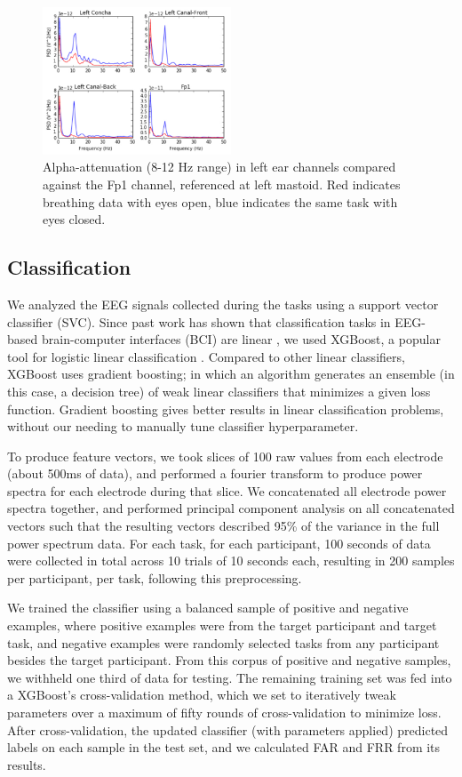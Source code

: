 \documentclass{sigchi}
\begin{document}
\begin{figure}[h]
\centering
\includegraphics[width=0.5\textwidth]{figures/002_AlphaAtt_all.jpg}
\caption{Alpha-attenuation (8-12 Hz range) in left ear channels compared against the Fp1 channel, referenced at left mastoid. Red indicates breathing data with eyes open, blue indicates the same task with eyes closed.}
\label{fig:alpha_atten}
\end{figure}

\subsection{Classification}

We analyzed the EEG signals collected during the tasks using a support vector classifier (SVC). Since past work has shown that classification tasks in EEG-based brain-computer interfaces (BCI) are linear \cite{Garrett2003a}, we used XGBoost, a popular tool for logistic linear classification \cite{Chen2016}. Compared to other linear classifiers, XGBoost uses gradient boosting; in which an algorithm generates an ensemble (in this case, a decision tree) of weak linear classifiers that minimizes a given loss function. Gradient boosting gives better results in linear classification problems, without our needing to manually tune classifier hyperparameter.

To produce feature vectors, we took slices of 100 raw values from each electrode (about 500ms of data), and performed a fourier transform to produce power spectra for each electrode during that slice. We concatenated all electrode power spectra together, and performed principal component analysis on all concatenated vectors such that the resulting vectors described 95\% of the variance in the full power spectrum data. For each task, for each participant, 100 seconds of data were collected in total across 10 trials of 10 seconds each, resulting in 200 samples per participant, per task, following this preprocessing.

We trained the classifier using a balanced sample of positive and negative examples, where positive examples were from the target participant and target task, and negative examples were randomly selected tasks from any participant besides the target participant. From this corpus of positive and negative samples, we withheld one third of data for testing. The remaining training set was fed into a XGBoost's cross-validation method, which we set to iteratively tweak parameters over a maximum of fifty rounds of cross-validation to minimize loss. After cross-validation, the updated classifier (with parameters applied) predicted labels on each sample in the test set, and we calculated FAR and FRR from its results.
\end{document}
